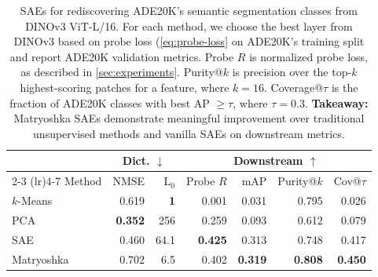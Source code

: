 \documentclass{article}
\theoremstyle{plain}
\theoremstyle{definition}
\theoremstyle{remark}
\begin{document}
\begin{table}[t]
    \centering
    \small
    \setlength{\tabcolsep}{3pt}
    \caption{SAEs for rediscovering ADE20K's semantic segmentation classes from DINOv3 ViT-L/16.
    For each method, we choose the best layer from DINOv3 based on probe loss (\cref{eq:probe-loss} on ADE20K's training split and report ADE20K validation metrics.
    Probe $R$ is normalized probe loss, as described in \cref{sec:experiments}.
    Purity@$k$ is precision over the top-$k$ highest-scoring patches for a feature, where $k=16$.
    Coverage@$\tau$ is the fraction of ADE20K classes with best AP $\geq\tau$, where $\tau= 0.3$.
    \textbf{Takeaway:} Matryoshka SAEs demonstrate meaningful improvement over traditional unsupervised methods and vanilla SAEs on downstream metrics.}
    \label{tab:ade20k}
    \begin{tabular}{lrrrrrr}
    \toprule
    & \multicolumn{2}{c}{Dict. $\downarrow$} & \multicolumn{4}{c}{Downstream $\uparrow$} \\
    \cmidrule(lr){2-3} \cmidrule(lr){4-7}
    Method & NMSE & L$_0$ & Probe $R$ & mAP & Purity@$k$ & Cov@$\tau$ \\
    \midrule
    $k$-Means & 0.619 & \textbf{1} & 0.001 & 0.031 & 0.795 & 0.026 \\  %
    PCA & \textbf{0.352} & 256 & 0.259 & 0.093 & 0.612 & 0.079 \\ %
    SAE & 0.460 & 64.1 & \textbf{0.425} & 0.313 & 0.748 & 0.417 \\  %
    Matryoshka & 0.702 & 6.5 & 0.402 & \textbf{0.319} & \textbf{0.808} & \textbf{0.450} \\  %
    \bottomrule
    \end{tabular}
\end{table}
\end{document}
